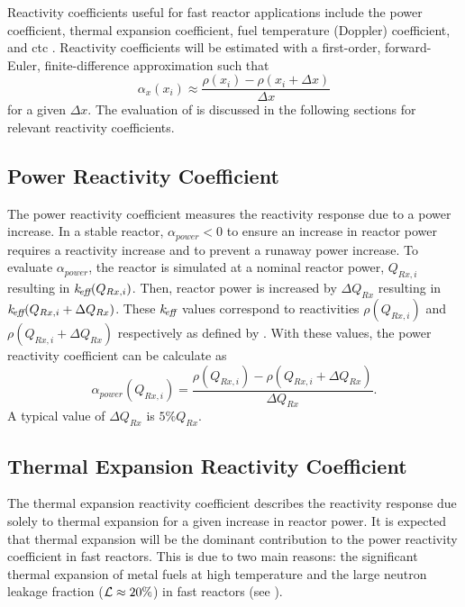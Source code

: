   Reactivity coefficients useful for fast reactor applications include the power
  coefficient, thermal expansion coefficient, fuel temperature (Doppler)
  coefficient, and \gls{ctc} \cite{textbookknief}.  Reactivity coefficients will
  be estimated with a first-order, forward-Euler, finite-difference
  approximation such that
  \begin{equation}
    \label{eq:reactivity_coefficient_finite_difference}
    \alpha_x(x_i) \approx \frac{\rho(x_i) - \rho(x_i + \Delta x)}{\Delta x}
  \end{equation}
  for a given $\Delta x$. The evaluation of
   is discussed in the
  following sections for relevant reactivity coefficients.

  \subsection{Power Reactivity Coefficient}
  \label{sec:power_reactivity_coefficient}
    The power reactivity coefficient measures the reactivity response due to a
    power increase. In a stable reactor, $\alpha_{power} < 0$ to ensure an
    increase in reactor power requires a reactivity increase and to prevent a
    runaway power increase. To evaluate $\alpha_{power}$, the reactor is
    simulated at a nominal reactor power, $Q_{Rx,i}$ resulting in
    $k_{\!\mbox{\scriptsize \em eff}}(Q_{Rx,i})$. Then, reactor power is increased by $\Delta Q_{Rx}$
    resulting in $k_{\!\mbox{\scriptsize \em eff}}(Q_{Rx,i} + \Delta Q_{Rx})$. These $k_{\!\mbox{\scriptsize \em eff}}$ values
    correspond to reactivities $\rho(Q_{Rx,i})$ and ${\rho(Q_{Rx,i} + \Delta
    Q_{Rx})}$ respectively as defined by . With these
    values, the power reactivity coefficient can be calculate as
    \begin{equation}
      \label{eq:power_reactivity_coefficient}
      \alpha_{power}(Q_{Rx,i}) = \frac{\rho(Q_{Rx,i}) - \rho(Q_{Rx,i} + 
        \Delta Q_{Rx})} {\Delta Q_{Rx}}.
    \end{equation}
    A typical value of $\Delta Q_{Rx}$ is $5\% Q_{Rx}$.

  \subsection{Thermal Expansion Reactivity Coefficient}
  \label{sec:thermal_expansion_reactivity_coefficent}
    The thermal expansion reactivity coefficient describes the reactivity 
    response due solely to thermal expansion for a given increase in reactor 
    power. It is expected that thermal expansion will be the dominant 
    contribution to the power reactivity coefficient in fast reactors. This is 
    due to two main reasons: the significant thermal expansion of metal fuels at
    high temperature  and the large neutron leakage fraction ($\mathcal{L} \approx
    20\%$) in fast reactors (see ).

